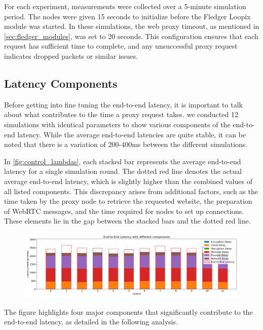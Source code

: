 \documentclass[a4paper,11pt,oneside]{report}
\begin{document}
For each experiment, measurements were collected over a 5-minute simulation period. The nodes were given 15 seconds to initialize before the Fledger Loopix module was started. In these simulations, the web proxy timeout, as mentioned in \autoref{sec:fledger_modules}, was set to 20 seconds. This configuration ensures that each request has sufficient time to complete, and any unsuccessful proxy request indicates dropped packets or similar issues.

\subsection{Latency Components}
Before getting into fine tuning the end-to-end latency, it is important to talk about what contributes to the time a proxy request takes. we conducted 12 simulations with identical parameters to show various components of the end-to-end latency. While the average end-to-end latencies are quite stable, it can be noted that there is a variation of 200-400ms between the different simulations.

In \autoref{fig:control_lambdas}, each stacked bar represents the average end-to-end latency for a single simulation round. The dotted red line denotes the actual average end-to-end latency, which is slightly higher than the combined values of all listed components. This discrepancy arises from additional factors, such as the time taken by the proxy node to retrieve the requested website, the preparation of WebRTC messages, and the time required for nodes to set up connections. These elements lie in the gap between the stacked bars and the dotted red line.


\begin{figure}[htbp]
    \centering
    \includegraphics[width=\textwidth]{plots/control_latency_components.png}
    \caption{}
    \label{fig:control_lambdas}
\end{figure}

The figure highlights four major components that significantly contribute to the end-to-end latency, as detailed in the following analysis.
\end{document}
